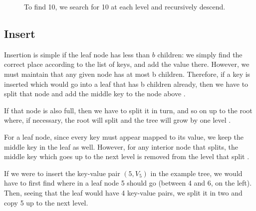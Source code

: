 \documentclass[a4paper,12pt]{article}
\begin{document}
\begin{figure}[h]
    \centering
    \caption{To find 10, we search for 10 at each level and recursively descend.}
    \label{fig:demotree2}
\end{figure}

\subsection{Insert}

Insertion is simple if the leaf node has less than $b$ children: we simply find the correct place according to the list of keys, and add the value there. However, we must maintain that any given node has at most b children. Therefore, if a key is inserted which would go into a leaf that has b children already, then we have to split that node and add the middle key to the node above \cite{elmasri_navathe_2011}.

If that node is also full, then we have to split it in turn, and so on up to the root where, if necessary, the root will split and the tree will grow by one level \cite{elmasri_navathe_2011}.

For a leaf node, since every key must appear mapped to its value, we keep the middle key in the leaf as well. However, for any interior node that splits, the middle key which goes up to the next level is removed from the level that split \cite{elmasri_navathe_2011}.

If we were to insert the key-value pair $(5,V_5)$ in the example tree, we would have to first find where in a leaf node 5 should go (between 4 and 6, on the left). Then, seeing that the leaf would have 4 key-value pairs, we split it in two and copy 5 up to the next level.
\end{document}
